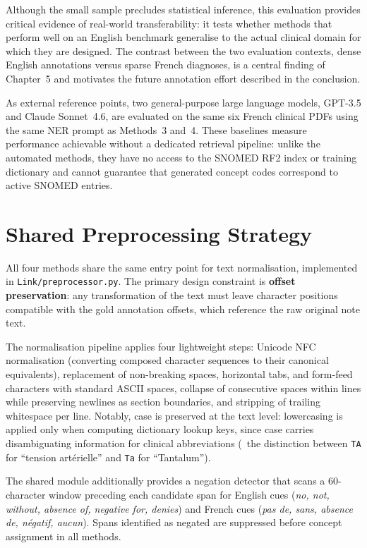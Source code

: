 Although the small sample precludes statistical inference, this evaluation provides critical evidence of real-world transferability: it tests whether methods that perform well on an English benchmark generalise to the actual clinical domain for which they are designed. The contrast between the two evaluation contexts, dense English annotations versus sparse French diagnoses, is a central finding of Chapter~5 and motivates the future annotation effort described in the conclusion.

As external reference points, two general-purpose large language models, GPT-3.5 and Claude Sonnet~4.6, are evaluated on the same six French clinical PDFs using the same NER prompt as Methods~3 and~4. These baselines measure performance achievable without a dedicated retrieval pipeline: unlike the automated methods, they have no access to the SNOMED RF2 index or training dictionary and cannot guarantee that generated concept codes correspond to active SNOMED entries.

\section{Shared Preprocessing Strategy}

All four methods share the same entry point for text normalisation, implemented in \texttt{Link/preprocessor.py}. The primary design constraint is \textbf{offset preservation}: any transformation of the text must leave character positions compatible with the gold annotation offsets, which reference the raw original note text.

The normalisation pipeline applies four lightweight steps: Unicode NFC normalisation (converting composed character sequences to their canonical equivalents), replacement of non-breaking spaces, horizontal tabs, and form-feed characters with standard ASCII spaces, collapse of consecutive spaces within lines while preserving newlines as section boundaries, and stripping of trailing whitespace per line. Notably, case is preserved at the text level: lowercasing is applied only when computing dictionary lookup keys, since case carries disambiguating information for clinical abbreviations (\eg\ the distinction between \texttt{TA} for ``tension artérielle'' and \texttt{Ta} for ``Tantalum'').

The shared module additionally provides a negation detector that scans a 60-character window preceding each candidate span for English cues (\textit{no, not, without, absence of, negative for, denies}) and French cues (\textit{pas de, sans, absence de, négatif, aucun}). Spans identified as negated are suppressed before concept assignment in all methods.

